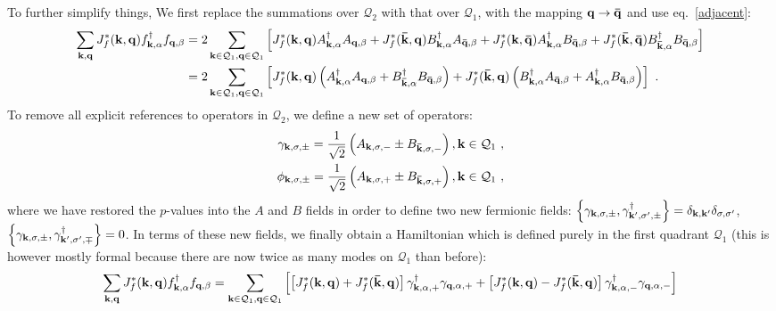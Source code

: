\documentclass[%
reprint,
superscriptaddress,
groupedaddress,
superscriptaddress,
onecolumn,
]{revtex4-2}
\begin{document}
To further simplify things, We first replace the summations over \(\mathcal{Q}_2\) with that over \(\mathcal{Q}_1\), with the mapping \({\bf q} \to {\bf \bar q}\) and use eq.~\ref{adjacent}:
\begin{equation}\begin{aligned}
	\sum_{{\bf k}, {\bf q}} J_f^*({\bf k},{\bf q}) f^\dagger_{{\bf k},\alpha}f_{{\bf q},\beta} 
	&= 2\sum_{{\bf k} \in \mathcal{Q}_1, {\bf q} \in \mathcal{Q}_1} \left[J_f^*({\bf k},{\bf q}) A^\dagger_{{\bf k},\alpha}A_{{\bf q},\beta} + J_f^*({\bf \bar k},{\bf q}) B^\dagger_{{\bf k},\alpha}A_{{\bf \bar q},\beta} + J_f^*({\bf k},{\bf \bar q}) A^\dagger_{{\bf k},\alpha}B_{{\bf \bar q},\beta} + J_f^*({\bf \bar k},{\bf \bar q}) B^\dagger_{{\bf \bar k},\alpha}B_{{\bf \bar q},\beta}\right]\\
	&= 2\sum_{{\bf k} \in \mathcal{Q}_1, {\bf q} \in \mathcal{Q}_1} \left[J_f^*({\bf k},{\bf q}) \left(A^\dagger_{{\bf k},\alpha}A_{{\bf q},\beta} + B^\dagger_{{\bf \bar k},\alpha}B_{{\bf \bar q},\beta}\right) + J_f^*({\bf \bar k},{\bf q}) \left(B^\dagger_{{\bf k},\alpha}A_{{\bf \bar q},\beta} + A^\dagger_{{\bf k},\alpha}B_{{\bf \bar q},\beta}\right)\right] ~.
\end{aligned}\end{equation}
To remove all explicit references to operators in \(\mathcal{Q}_2\), we define a new set of operators:
\begin{equation}\begin{aligned}\label{defineGamma}
	\gamma_{{\bf k},\sigma,\pm} = \frac{1}{\sqrt{2}}\left(A_{{\bf k},\sigma,-} \pm B_{{\bf \bar k},\sigma,-}\right), {\bf k}\in \mathcal{Q}_1~,\\
	\phi_{{\bf k},\sigma,\pm} = \frac{1}{\sqrt{2}}\left(A_{{\bf k},\sigma,+} \pm B_{{\bf \bar k},\sigma,+}\right), {\bf k}\in \mathcal{Q}_1~,
\end{aligned}\end{equation}
where we have restored the \(p\)-values into the \(A\) and \(B\) fields in order to define two new fermionic fields: \(\left\{\gamma_{{\bf k},\sigma,\pm}, \gamma_{{\bf k}^\prime,\sigma^\prime,\pm}^\dagger\right\} = \delta_{{\bf k},{\bf k}^\prime}\delta_{\sigma,\sigma^\prime}\), \(\left\{\gamma_{{\bf k},\sigma,\pm}, \gamma_{{\bf k}^\prime,\sigma^\prime,\mp}^\dagger\right\} = 0\). In terms of these new fields, we finally obtain a Hamiltonian which is defined purely in the first quadrant \(\mathcal{Q}_1\) (this is however mostly formal because there are now twice as many modes on \(\mathcal{Q}_1\) than before):
\begin{equation}\begin{aligned}
	\sum_{{\bf k}, {\bf q}} J_f^*({\bf k},{\bf q}) f^\dagger_{{\bf k},\alpha}f_{{\bf q},\beta} 
	&= \sum_{{\bf k} \in \mathcal{Q}_1, {\bf q} \in \mathcal{Q}_1} \left[\left[J_f^*({\bf k},{\bf q}) + J_f^*({\bf \bar k},{\bf q})\right] \gamma^\dagger_{{\bf k},\alpha,+}\gamma_{{\bf q},\alpha,+} + \left[J_f^*({\bf k},{\bf q}) - J_f^*({\bf \bar k},{\bf q})\right] \gamma^\dagger_{{\bf k},\alpha,-}\gamma_{{\bf q},\alpha,-}\right] \\
\end{aligned}\end{equation}
\end{document}
